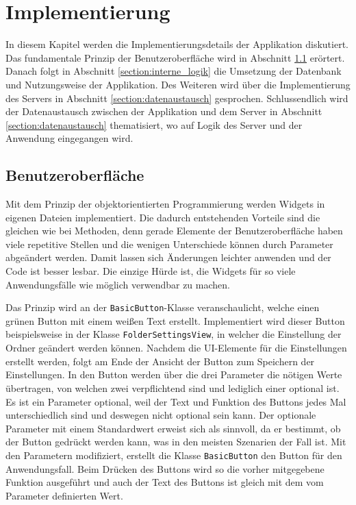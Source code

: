 \chapter{Implementierung}
\label{chapter:programmierung}
In diesem Kapitel werden die Implementierungsdetails der Applikation diskutiert. Das fundamentale Prinzip der Benutzeroberfläche wird in Abschnitt \ref{section:benutzeroberfläche} erörtert. Danach folgt in Abschnitt \ref{section:interne_logik} die Umsetzung der Datenbank und Nutzungsweise der Applikation. Des Weiteren wird über die Implementierung des Servers in Abschnitt \ref{section:datenaustausch} gesprochen. Schlussendlich wird der Datenaustausch zwischen der Applikation und dem Server in Abschnitt \ref{section:datenaustausch} thematisiert, wo auf Logik des Server und der Anwendung eingegangen wird.

\section{Benutzeroberfläche}
\label{section:benutzeroberfläche}
Mit dem Prinzip der objektorientierten Programmierung werden Widgets in eigenen Dateien implementiert. Die dadurch entstehenden Vorteile sind die gleichen wie bei Methoden, denn gerade Elemente der Benutzeroberfläche haben viele repetitive Stellen und die wenigen Unterschiede können durch Parameter abgeändert werden. Damit lassen sich Änderungen leichter anwenden und der Code ist besser lesbar. Die einzige Hürde ist, die Widgets für so viele Anwendungsfälle wie möglich verwendbar zu machen.

Das Prinzip wird an der \texttt{BasicButton}-Klasse veranschaulicht, welche einen grünen Button mit einem weißen Text erstellt. Implementiert wird dieser Button beispielsweise in der Klasse \texttt{FolderSettingsView}, in welcher die Einstellung der Ordner geändert werden können. Nachdem die UI-Elemente für die Einstellungen erstellt werden, folgt am Ende der Ansicht der Button zum Speichern der Einstellungen. In den Button werden über die drei Parameter die nötigen Werte übertragen, von welchen zwei verpflichtend sind und lediglich einer optional ist. Es ist ein Parameter optional, weil der Text und Funktion des Buttons jedes Mal unterschiedlich sind und deswegen nicht optional sein kann. Der optionale Parameter mit einem Standardwert erweist sich als sinnvoll, da er bestimmt, ob der Button gedrückt werden kann, was in den meisten Szenarien der Fall ist. Mit den Parametern modifiziert, erstellt die Klasse \texttt{BasicButton} den Button für den Anwendungsfall. Beim Drücken des Buttons wird so die vorher mitgegebene Funktion ausgeführt und auch der Text des Buttons ist gleich mit dem vom Parameter definierten Wert.

